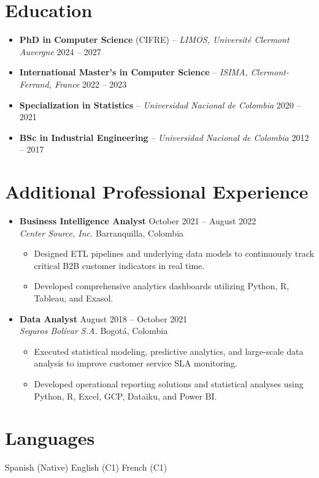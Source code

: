 \documentclass[12pt,a4paper]{article}
\begin{document}
\section*{Education}
\begin{itemize}
\item \textbf{PhD in Computer Science} (CIFRE) -- \textit{LIMOS, Université Clermont Auvergne} \hfill 2024 -- 2027
\item \textbf{International Master's in Computer Science} -- \textit{ISIMA, Clermont-Ferrand, France} \hfill 2022 -- 2023
\item \textbf{Specialization in Statistics} -- \textit{Universidad Nacional de Colombia} \hfill 2020 -- 2021
\item \textbf{BSc in Industrial Engineering} -- \textit{Universidad Nacional de Colombia} \hfill 2012 -- 2017
\end{itemize}

\section*{Additional Professional Experience}
\begin{itemize}
\item \textbf{Business Intelligence Analyst} \hfill October 2021 -- August 2022\\
\textit{Center Source, Inc.} \hfill Barranquilla, Colombia
\begin{itemize}
\item Designed ETL pipelines and underlying data models to continuously track critical B2B customer indicators in real time.
\item Developed comprehensive analytics dashboards utilizing Python, R, Tableau, and Exasol.
\end{itemize}

\item \textbf{Data Analyst} \hfill August 2018 -- October 2021\\
\textit{Seguros Bolívar S.A.} \hfill Bogotá, Colombia
\begin{itemize}
\item Executed statistical modeling, predictive analytics, and large-scale data analysis to improve customer service SLA monitoring.
\item Developed operational reporting solutions and statistical analyses using Python, R, Excel, GCP, Dataiku, and Power BI.
\end{itemize}
\end{itemize}

\section*{Languages}
Spanish (Native) \textbar{} English (C1) \textbar{} French (C1)
\end{document}
